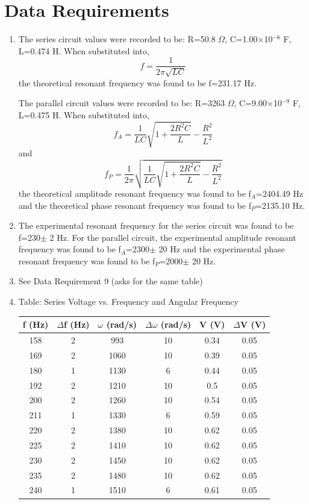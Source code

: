 \section{Data Requirements}
\begin{enumerate}[resume]
\item The series circuit values were recorded to be: R=50.8 $\Omega$, C=1.00$\times$10$^{-6}$ F, L=0.474 H. When substituted into,
$$
f=\frac{1}{2\pi\sqrt{LC}}
$$
the theoretical resonant frequency was found to be f=231.17 Hz.

The parallel circuit values were recorded to be: R=3263 $\Omega$, C=9.00$\times$10$^{-9}$ F, L=0.475 H. When substituted into,
$$
f_A=\frac{1}{LC}\sqrt{1+\frac{2R^2C}{L}}-\frac{R^2}{L^2}
$$
and
$$
f_P=\frac{1}{2\pi}\sqrt{\frac{1}{LC}\sqrt{1+\frac{2R^2C}{L}}-\frac{R^2}{L^2}}
$$
the theoretical amplitude resonant frequency was found to be f$_A$=2404.49 Hz and the theoretical phase resonant frequency was found to be f$_P$=2135.10 Hz.
\item The experimental resonant frequency for the series circuit was found to be f=230$\pm$ 2 Hz. For the parallel circuit, the experimental amplitude resonant frequency was found to be f$_A$=2300$\pm$ 20 Hz and the experimental phase resonant frequency was found to be f$_P$=2000$\pm$ 20 Hz.
\item See Data Requirement 9 (asks for the same table)
\newpage
\item Table: Series Voltage vs. Frequency and Angular Frequency
\begin{table}[h]
\center
\begin{tabular}{|c|c|c|c|c|c|}
\hline
f (Hz) & $\Delta$f (Hz) & $\omega$ (rad/s) & $\Delta\omega$ (rad/s) & V (V) & $\Delta$V (V)\\
\hline
158 & 2 & 993  & 10 & 0.34 & 0.05\\
169 & 2 & 1060 & 10 & 0.39 & 0.05\\
180 & 1 & 1130 & 6  & 0.44 & 0.05\\
192 & 2 & 1210 & 10 & 0.5  & 0.05\\
200 & 2 & 1260 & 10 & 0.54 & 0.05\\
211 & 1 & 1330 & 6  & 0.59 & 0.05\\
220 & 2 & 1380 & 10 & 0.62 & 0.05\\
225 & 2 & 1410 & 10 & 0.62 & 0.05\\
230 & 2 & 1450 & 10 & 0.62 & 0.05\\
235 & 2 & 1480 & 10 & 0.62 & 0.05\\
240 & 1 & 1510 & 6  & 0.61 & 0.05\\

\end{tabular}
\end{table}
\end{enumerate}
